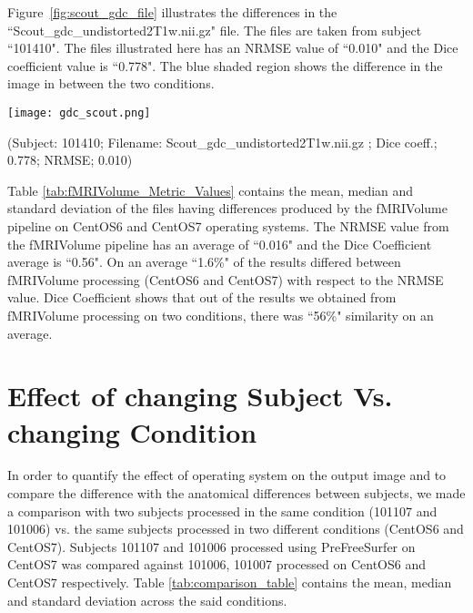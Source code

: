 Figure~\ref{fig:scout_gdc_file} illustrates the differences in the ``Scout\_gdc\_undistorted2T1w.nii.gz" file. The files are taken from subject ``101410". The files illustrated here has an NRMSE value of ``0.010" and the Dice coefficient value is ``0.778". The blue shaded region shows the difference in the image in between the two conditions.

\hfill \break
\begin{center}
\texttt{[image: gdc\_scout.png]}
\caption*{(Subject: 101410; Filename: Scout\_gdc\_undistorted2T1w.nii.gz ; Dice coeff.; 0.778; NRMSE; 0.010)}
\label{fig:scout_gdc_file}
\end{center}

Table \ref{tab:fMRIVolume_Metric_Values} contains the mean, median and standard deviation of the files having differences produced by the fMRIVolume pipeline on CentOS6 and CentOS7 operating systems. The NRMSE value from the fMRIVolume pipeline has an average of ``0.016" and the Dice Coefficient average is ``0.56". On an average ``1.6\%" of the results differed between fMRIVolume processing (CentOS6 and CentOS7) with respect to the NRMSE value. Dice Coefficient shows that out of the results we obtained from fMRIVolume processing on two conditions, there was ``56\%" similarity on an average.

\section{Effect of changing Subject Vs. changing Condition}\label{sec:comparison}
In order to quantify the effect of operating system on the output image and to compare the difference with the anatomical differences between subjects, we made a comparison with two subjects processed in the same condition (101107 and 101006) vs. the same subjects processed in two different conditions (CentOS6 and CentOS7). Subjects 101107 and 101006 processed using PreFreeSurfer on CentOS7 was compared against 101006, 101007 processed on CentOS6 and CentOS7 respectively. Table \ref{tab:comparison_table} contains the mean, median and standard deviation across the said conditions.


